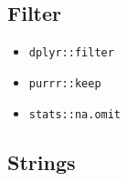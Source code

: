 \documentclass[
]{book}
\providecommand{\tightlist}{%
  \setlength{\itemsep}{0pt}\setlength{\parskip}{0pt}}
\begin{document}
\hypertarget{filter}{%
\subsection{Filter}\label{filter}}

\begin{itemize}
\tightlist
\item
  \texttt{dplyr::filter}
\item
  \texttt{purrr::keep}
\item
  \texttt{stats::na.omit}
\end{itemize}

\hypertarget{strings}{%
\subsection{Strings}\label{strings}}
\end{document}
